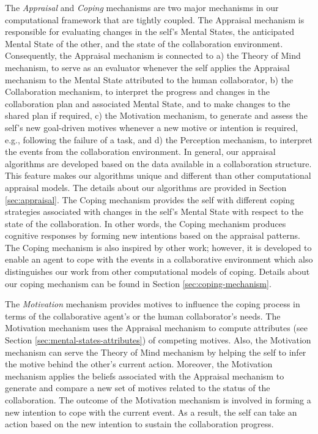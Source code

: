 \documentclass[12pt]{report}
\begin{document}
{\color{red}The \textit{Appraisal} and \textit{Coping} mechanisms are two major
mechanisms in our computational framework that are tightly coupled. The
Appraisal mechanism is responsible for evaluating changes in the self's Mental
States, the anticipated Mental State of the other, and the state of the
collaboration environment. Consequently, the Appraisal mechanism is connected to
a) the Theory of Mind mechanism, to serve as an evaluator whenever the self
applies the Appraisal mechanism to the Mental State attributed to the human
collaborator, b) the Collaboration mechanism, to interpret the progress and
changes in the collaboration plan and associated Mental State, and to make
changes to the shared plan if required, c) the Motivation mechanism, to generate
and assess the self's new goal-driven motives whenever a new motive or intention
is required, e.g., following the failure of a task, and d) the Perception
mechanism, to interpret the events from the collaboration environment.
In general, our appraisal algorithms are developed based on the data available
in a collaboration structure. This feature makes our algorithms unique and
different than other computational appraisal models. The details about our
algorithms are provided in Section \ref{sec:appraisal}. The Coping mechanism
provides the self with different coping strategies associated with changes in
the self's Mental State with respect to the state of the collaboration. In
other words, the Coping mechanism produces cognitive responses by forming new
intentions based on the appraisal patterns. The Coping mechanism is also
inspired by other work; however, it is developed to enable an agent to cope with
the events in a collaborative environment which also distinguishes our work from
other computational models of coping. Details about our coping mechanism can be
found in Section \ref{sec:coping-mechanism}.}

The \textit{Motivation} mechanism provides motives to influence the coping
process in terms of the collaborative agent's or the human collaborator's needs.
The Motivation mechanism uses the Appraisal mechanism to compute attributes (see
Section \ref{sec:mental-states-attributes}) of competing motives. Also, the
Motivation mechanism can serve the Theory of Mind mechanism by helping the self
to infer the motive behind the other's current action. Moreover, the Motivation
mechanism applies the beliefs associated with the Appraisal mechanism to
generate and compare a new set of motives related to the status of the
collaboration. The outcome of the Motivation mechanism is involved in forming a
new intention to cope with the current event. As a result, the self can take an
action based on the new intention to sustain the collaboration progress.
\end{document}
